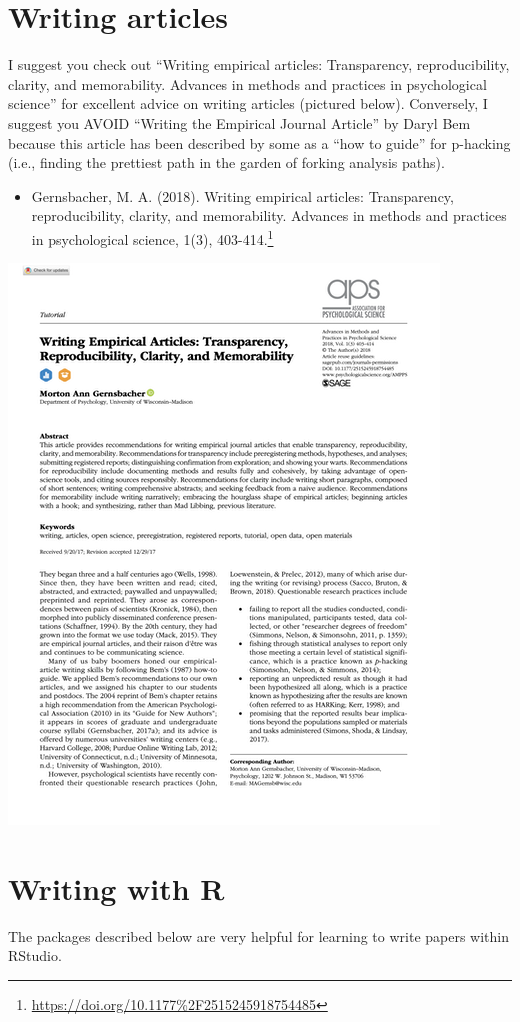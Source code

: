 \documentclass[
]{krantz}
\providecommand{\tightlist}{%
  \setlength{\itemsep}{0pt}\setlength{\parskip}{0pt}}
\renewcommand{\href}[2]{#2\footnote{\url{#1}}}
\begin{document}
\hypertarget{writing-articles}{%
\section{Writing articles}\label{writing-articles}}

I suggest you check out \citep{gernsbacher2018writing} ``Writing empirical articles: Transparency, reproducibility, clarity, and memorability. Advances in methods and practices in psychological science'' for excellent advice on writing articles (pictured below). Conversely, I suggest you AVOID ``Writing the Empirical Journal Article'' by Daryl Bem because this article has been described by some as a ``how to guide'' for p-hacking (i.e., finding the prettiest path in the garden of forking analysis paths).

\begin{itemize}
\tightlist
\item
  \href{https://doi.org/10.1177\%2F2515245918754485}{Gernsbacher, M. A. (2018). Writing empirical articles: Transparency, reproducibility, clarity, and memorability. Advances in methods and practices in psychological science, 1(3), 403-414.}
\end{itemize}

\includegraphics[width=0.5\linewidth]{images/gernsbacher}

\hypertarget{writing-with-r}{%
\section{Writing with R}\label{writing-with-r}}

The packages described below are very helpful for learning to write papers within RStudio.
\end{document}
